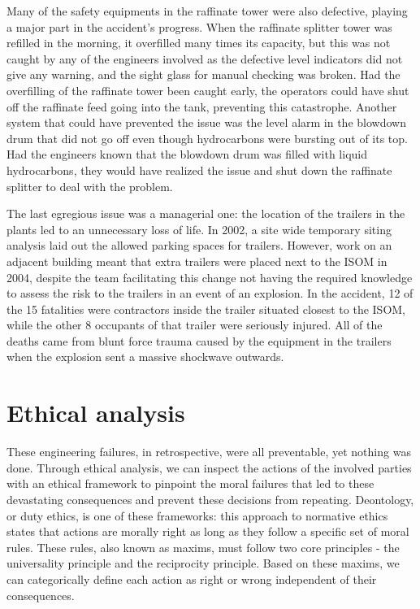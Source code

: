 \documentclass[12pt]{article}
\begin{document}
	  Many of the safety equipments in the raffinate tower were also defective, playing a major part in the accident's progress. When the raffinate splitter tower was refilled in the morning, it overfilled many times its capacity, but this was not caught by any of the engineers involved as the defective level indicators did not give any warning, and the sight glass for manual checking was broken. Had the overfilling of the raffinate tower been caught early, the operators could have shut off the raffinate feed going into the tank, preventing this catastrophe. Another system that could have prevented the issue was the level alarm in the blowdown drum that did not go off even though hydrocarbons were bursting out of its top. Had the engineers known that the blowdown drum was filled with liquid hydrocarbons, they would have realized the issue and shut down the raffinate splitter to deal with the problem.
	  
	  The last egregious issue was a managerial one: the location of the trailers in the plants led to an unnecessary loss of life. In 2002, a site wide temporary siting analysis laid out the allowed parking spaces for trailers. However, work on an adjacent building meant that extra trailers were placed next to the ISOM in 2004, despite the team facilitating this change not having the required knowledge to assess the risk to the trailers in an event of an explosion. In the accident, 12 of the 15 fatalities were contractors inside the trailer situated closest to the ISOM, while the other 8 occupants of that trailer were seriously injured. All of the deaths came from blunt force trauma caused by the equipment in the trailers when the explosion sent a massive shockwave outwards.
	
	\section*{Ethical analysis}
	These engineering failures, in retrospective, were all preventable, yet nothing was done. Through ethical analysis, we can inspect the actions of the involved parties with an ethical framework to  pinpoint the moral failures that led to these devastating consequences and prevent these decisions from repeating. Deontology, or duty ethics, is one of these frameworks: this approach to normative ethics states that actions are morally right as long as they follow a specific set of moral rules. These rules, also known as maxims, must follow two core principles - the universality principle and the reciprocity principle. Based on these maxims, we can categorically define each action as right or wrong independent of their consequences.
	
\end{document}
